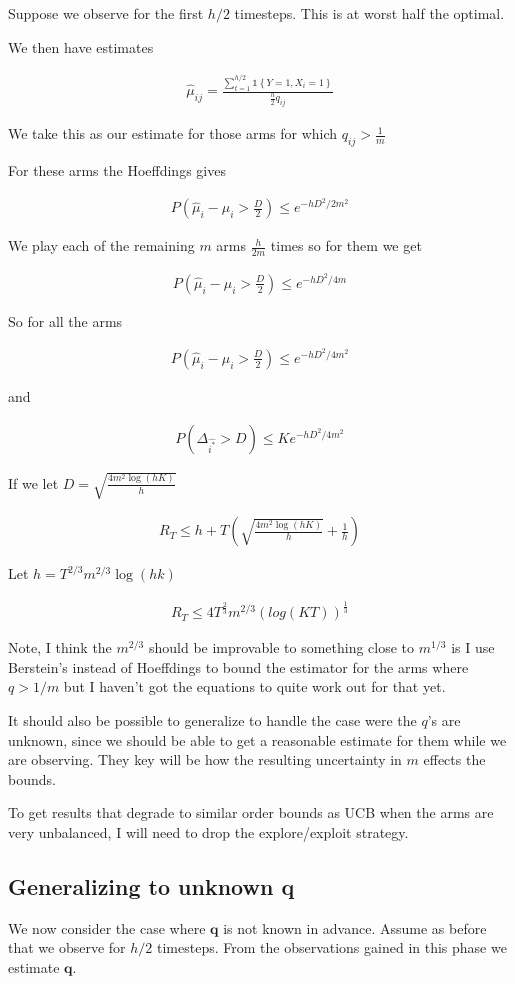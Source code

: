 \documentclass{article}
\newcommand{\set}[1]{\left\{#1\right\}}
\newcommand{\ind}[1]{\mathds{1}\!\!\set{#1}}
\newcommand{\eqn}[1]{\begin{align}#1\end{align}}
\theoremstyle{plain}
\theoremstyle{definition}
\begin{document}
Suppose we observe for the first $h/2$ timesteps. This is at worst half the optimal. 

We then have estimates 

\eqn {
\hat{\mu}_{ij} = \frac{\sum_{t=1}^{h/2}\ind{Y=1,X_i=1}}{\frac{h}{2}q_{ij}}
}

We take this as our estimate for those arms for which $q_{ij} > \frac{1}{m}$

For these arms the Hoeffdings gives 

\eqn{
P(\hat{\mu}_i - \mu_{i} > \frac{D}{2}) \leq e^{-hD^2/2m^2}
}

We play each of the remaining $m$ arms $\frac{h}{2m}$ times so for them we get

\eqn{
P(\hat{\mu}_i - \mu_{i} > \frac{D}{2}) \leq e^{-hD^2/4m}
}

So for all the arms 

\eqn{
P(\hat{\mu}_i - \mu_{i} > \frac{D}{2}) \leq e^{-hD^2/4m^2}
}

and 



\eqn{
\label{eqn:unbalancedHoeffdings}
P(\Delta_{\hat{i^*}} > D) \leq Ke^{-hD^2/4m^2}
}

If we let $D = \sqrt{\frac{4m^2\log(hK)}{h}}$

\eqn{
R_T  \leq h + T\left(\sqrt{\frac{4m^2\log(hK)}{h}} + \frac{1}{h}\right)
}

Let $h = T^{2/3}m^{2/3}\log(hk)$


\eqn {
R_T  \leq 4T^{\frac{2}{3}}m^{2/3}(log(KT))^{\frac{1}{3}}
}

Note, I think the $m^{2/3}$ should be improvable to something close to $m^{1/3}$ is I use Berstein's instead of Hoeffdings to bound the estimator for the arms where $q > 1/m$ but I haven't got the equations to quite work out for that yet. 

It should also be possible to generalize to handle the case were the $q$'s are unknown, since we should be able to get a reasonable estimate for them while we are observing. They key will be how the resulting uncertainty in $m$ effects the bounds. 

To get results that degrade to similar order bounds as UCB when the arms are very unbalanced, I will need to drop the explore/exploit strategy. 


\subsection{Generalizing to unknown q}
We now consider the case where $\boldsymbol{q}$ is not known in advance. Assume as before that we observe for $h/2$ timesteps. From the observations gained in this phase we estimate $\boldsymbol{q}$.
\end{document}
